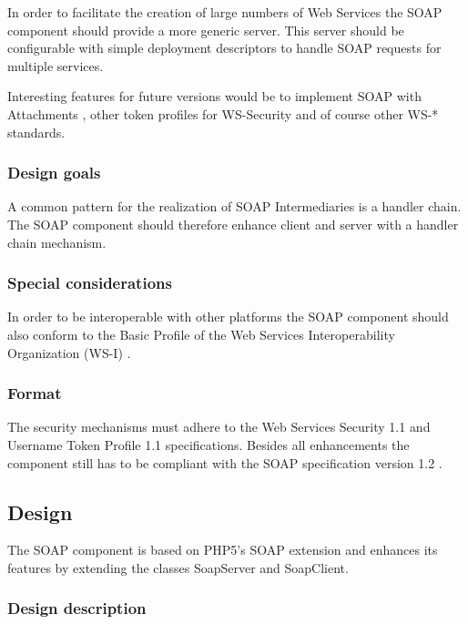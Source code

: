 \documentclass[10pt,final,a4paper,oneside]{article}
\begin{document}
In order to facilitate the creation
of large numbers of Web Services
the SOAP component should provide
a more generic server.
This server should be configurable with simple
deployment descriptors to handle
SOAP requests for multiple services.

Interesting features for future versions would be
to implement SOAP with Attachments \cite{SwA},
other token profiles for WS-Security and of course
other WS-* standards.


\subsubsection{Design goals}
A common pattern for the realization of
SOAP Intermediaries is a handler chain.
The SOAP component should therefore
enhance client and server
with a handler chain mechanism.


\subsubsection{Special considerations}
In order to be interoperable with other platforms
the SOAP component should also conform
to the Basic Profile of the
Web Services Interoperability Organization (WS-I) \cite{BasicProfile}.


\subsubsection{Format}
The security mechanisms must adhere
to the Web Services Security 1.1 \cite{WSS}
and Username Token Profile 1.1 \cite{UTP}
specifications.
Besides all enhancements the component
still has to be compliant with
the SOAP specification version 1.2 \cite{SOAP}.


\subsection{Design}\label{subsec:SOAPDesign}
%
%
The SOAP component is based on PHP5's SOAP extension
and enhances its features by extending the classes
SoapServer and SoapClient.

\subsubsection{Design description}
\end{document}
